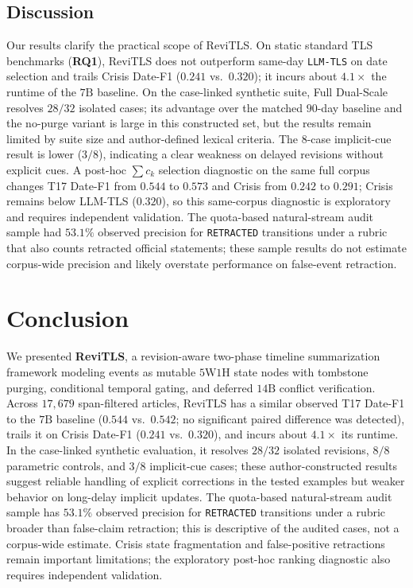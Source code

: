 \documentclass[journal]{IEEEtran}
\begin{document}
\subsection{Discussion}
\label{subsec:discussion}

Our results clarify the practical scope of ReviTLS. On static standard TLS benchmarks (\textbf{RQ1}), ReviTLS does not outperform same-day \texttt{LLM-TLS} on date selection and trails Crisis Date-F1 ($0.241$ vs.\ $0.320$); it incurs about $4.1\times$ the runtime of the $7\text{B}$ baseline. On the case-linked synthetic suite, Full Dual-Scale resolves $28/32$ isolated cases; its advantage over the matched $90$-day baseline and the no-purge variant is large in this constructed set, but the results remain limited by suite size and author-defined lexical criteria. The $8$-case implicit-cue result is lower ($3/8$), indicating a clear weakness on delayed revisions without explicit cues. A post-hoc $\sum c_k$ selection diagnostic on the same full corpus changes T17 Date-F1 from $0.544$ to $0.573$ and Crisis from $0.242$ to $0.291$; Crisis remains below LLM-TLS ($0.320$), so this same-corpus diagnostic is exploratory and requires independent validation. The quota-based natural-stream audit sample had $53.1\%$ observed precision for \texttt{RETRACTED} transitions under a rubric that also counts retracted official statements; these sample results do not estimate corpus-wide precision and likely overstate performance on false-event retraction.

\section{Conclusion}
\label{sec:conclusion}

We presented \textbf{ReviTLS}, a revision-aware two-phase timeline summarization framework modeling events as mutable $5\text{W}1\text{H}$ state nodes with tombstone purging, conditional temporal gating, and deferred $14\text{B}$ conflict verification. Across $17{,}679$ span-filtered articles, ReviTLS has a similar observed T17 Date-F1 to the $7\text{B}$ baseline ($0.544$ vs.\ $0.542$; no significant paired difference was detected), trails it on Crisis Date-F1 ($0.241$ vs.\ $0.320$), and incurs about $4.1\times$ its runtime. In the case-linked synthetic evaluation, it resolves $28/32$ isolated revisions, $8/8$ parametric controls, and $3/8$ implicit-cue cases; these author-constructed results suggest reliable handling of explicit corrections in the tested examples but weaker behavior on long-delay implicit updates. The quota-based natural-stream audit sample has $53.1\%$ observed precision for \texttt{RETRACTED} transitions under a rubric broader than false-claim retraction; this is descriptive of the audited cases, not a corpus-wide estimate. Crisis state fragmentation and false-positive retractions remain important limitations; the exploratory post-hoc ranking diagnostic also requires independent validation.
\end{document}

